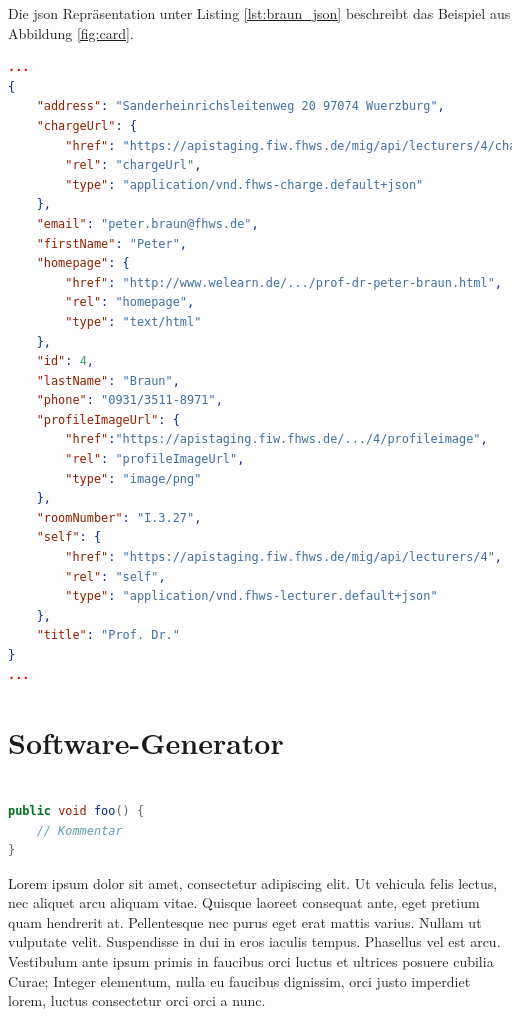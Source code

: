 Die  \acf{json} Repräsentation unter Listing \ref{lst:braun_json} beschreibt das Beispiel aus Abbildung \ref{fig:card}.

\begin{lstlisting}[label=lst:braun_json,
language=json,
firstnumber=1,
caption=Demo Daten eines Lecturers für die Darstellung gemäß Abbildung \ref{fig:card}]	
...			   
{
	"address": "Sanderheinrichsleitenweg 20 97074 Wuerzburg",
	"chargeUrl": {
		"href": "https://apistaging.fiw.fhws.de/mig/api/lecturers/4/charges",
		"rel": "chargeUrl",
		"type": "application/vnd.fhws-charge.default+json"
	},
	"email": "peter.braun@fhws.de",
	"firstName": "Peter",
	"homepage": {
		"href": "http://www.welearn.de/.../prof-dr-peter-braun.html",
		"rel": "homepage",
		"type": "text/html"
	},
	"id": 4,
	"lastName": "Braun",
	"phone": "0931/3511-8971",
	"profileImageUrl": {
		"href":"https://apistaging.fiw.fhws.de/.../4/profileimage",
		"rel": "profileImageUrl",
		"type": "image/png"
	},
	"roomNumber": "I.3.27",
	"self": {
		"href": "https://apistaging.fiw.fhws.de/mig/api/lecturers/4",
		"rel": "self",
		"type": "application/vnd.fhws-lecturer.default+json"
	},
	"title": "Prof. Dr."
}
...
\end{lstlisting}








\section{Software-Generator}











\begin{lstlisting}[label=lst:java,
				   language=java,
				   firstnumber=1,
				   caption=Beispiel für einen Quelltext]				   

public void foo() {				   
	// Kommentar
}
\end{lstlisting}

Lorem ipsum dolor sit amet, consectetur adipiscing elit. Ut vehicula felis lectus, nec aliquet arcu aliquam vitae. Quisque laoreet consequat ante, eget pretium quam hendrerit at. Pellentesque nec purus eget erat mattis varius. Nullam ut vulputate velit. Suspendisse in dui in eros iaculis tempus. Phasellus vel est arcu. Vestibulum ante ipsum primis in faucibus orci luctus et ultrices posuere cubilia Curae; Integer elementum, nulla eu faucibus dignissim, orci justo imperdiet lorem, luctus consectetur orci orci a nunc.

